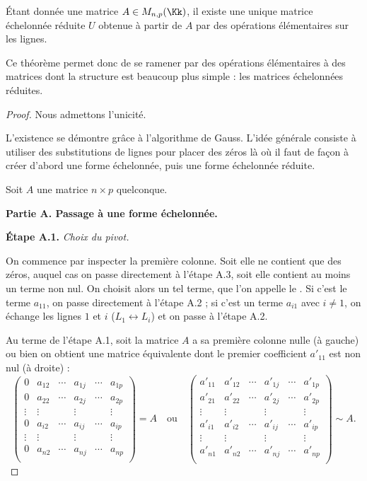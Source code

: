 \documentclass[class=report,crop=false]{standalone}
\begin{document}
\begin{theoreme}\label{Gauss}
\'Etant donnée une matrice $A\in M_{n,p}(\Kk)$, il existe une unique
matrice échelonnée réduite $U$ obtenue à partir de $A$
par des opérations élémentaires sur les lignes.
\end{theoreme}

Ce théorème permet donc de se ramener par des opérations élémentaires
à des matrices dont la structure est beaucoup plus simple :
les matrices échelonnées réduites.

\begin{proof}
Nous admettons l'unicité.

L'existence se démontre grâce à
l'algorithme de Gauss. L'idée générale consiste à utiliser des substitutions de
lignes pour placer des zéros là où il faut de façon à
créer d'abord une forme échelonnée, puis une forme
échelonnée réduite.


\bigskip

Soit $A$ une matrice $n\times p$ quelconque.

\bigskip

\textbf{Partie A. Passage à une forme échelonnée.}

\textbf{\'Etape A.1.}  \emph{Choix du pivot.}

On commence par inspecter la
première colonne. Soit elle ne contient que des zéros,
auquel cas on passe directement à l'étape A.3,
soit elle contient au moins un terme non nul.
On choisit alors un tel terme, que l'on appelle le .
Si c'est le terme $a_{11}$, on passe directement à l'étape A.2 ;
si c'est un terme $a_{i1}$ avec $i\neq1$, on échange les lignes $1$
et $i$ ($L_1 \leftrightarrow L_i$) et on passe à l'étape A.2.

Au terme de l'étape A.1, soit la matrice $A$ a sa première colonne nulle (à gauche)
ou bien on obtient une matrice équivalente dont le premier coefficient $a'_{11}$ est non nul (à droite) :
$$\begin{pmatrix}
0&a_{12}&\cdots&a_{1j}&\cdots&a_{1p}\\
0&a_{22}&\cdots&a_{2j}&\cdots&a_{2p}\\
\vdots&\vdots&&\vdots&&\vdots\\
0&a_{i2}&\cdots&a_{ij}&\cdots&a_{ip}\\
\vdots&\vdots&&\vdots&&\vdots\\
0&a_{n2}&\cdots&a_{nj}&\cdots&a_{np}\\
\end{pmatrix}=A
\quad \text{ou} \quad
\begin{pmatrix}
a'_{11}&a'_{12}&\cdots&a'_{1j}&\cdots&a'_{1p}\\
a'_{21}&a'_{22}&\cdots&a'_{2j}&\cdots&a'_{2p}\\
\vdots&\vdots&&\vdots&&\vdots\\
a'_{i1}&a'_{i2}&\cdots&a'_{ij}&\cdots&a'_{ip}\\
\vdots&\vdots&&\vdots&&\vdots\\
a'_{n1}&a'_{n2}&\cdots&a'_{nj}&\cdots&a'_{np}\\
\end{pmatrix}\sim A.
$$


\end{proof}
\end{document}
